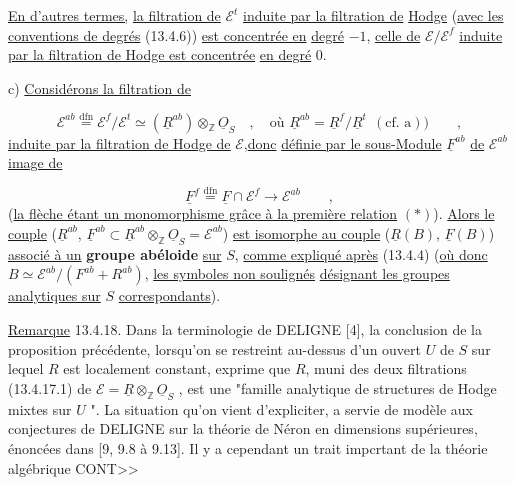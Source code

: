 
\underline{En d'autres termes,} \underline{la filtration de} $\mathcal{E}^t$ \underline{induite par la filtration de} \underline{Hodge} (\underline{avec les conventions de degrés} (13.4.6)) \underline{est concentrée en} \underline{degré} $-1$, \underline{celle de} $\mathcal{E}/\mathcal{E}^f$ \underline{induite par la filtration de Hodge est concentrée} \underline{en degré} $0$.

c) \underline{Considérons la filtration de}

\begin{equation*}
\mathcal{E}^{ab} \overset{\mathrm{dfn}}{=} \mathcal{E}^f/\mathcal{E}^t \simeq (\underline{R}^{ab}) \otimes_{\mathbb{Z}} \underline{O}_S \quad , \quad \text{où } \underline{R}^{ab} = \underline{R}^f/\underline{R}^t \ \ (\text{cf. a})) \qquad ,
\end{equation*}
\underline{induite par la filtration de Hodge de} $\mathcal{E}$,\underline{donc} \underline{définie par le sous-Module} $\underline{F}^{ab}$ \underline{de} $\mathcal{E}^{ab}$ \underline{image de}

\begin{equation*}
\underline{F}^f \overset{\mathrm{dfn}}{=} \underline{F} \cap \mathcal{E}^f \longrightarrow \mathcal{E}^{ab} \qquad ,
\end{equation*}
(\underline{la flèche étant un monomorphisme grâce à la première relation} $(*)$). \underline{Alors le couple} ($\underline{R}^{ab}$, $\underline{F}^{ab} \subset \underline{R}^{ab} \otimes_{\mathbb{Z}} \underline{O}_S = \mathcal{E}^{ab}$) \underline{est isomorphe au couple} ($\underline{R}(B)$, $\underline{F}(B)$) \underline{associé à un} \textbf{groupe abéloide} \underline{sur} $S$, \underline{comme expliqué après} (13.4.4) (\underline{où donc} $B \simeq \mathcal{E}^{ab}/(F^{ab}+ R^{ab})$, \underline{les symboles non soulignés} \underline{désignant les groupes analytiques sur} $S$ \underline{correspondants}).

\underline{Remarque} 13.4.18. Dans la terminologie de DELIGNE [4], la conclusion de la proposition précédente, lorsqu'on se restreint au-dessus d'un ouvert $U$ de $S$ sur lequel $R$ est localement constant, exprime que $R$, muni des deux filtrations (13.4.17.1) de $\mathcal{E} = \underline{R} \otimes_{\mathbb{Z}} \underline{O}_S$ , est une "famille analytique de structures de Hodge mixtes sur $U$ ". La situation qu'on vient d'expliciter, a servie de modèle aux conjectures de DELIGNE sur la théorie de Néron en dimensions supérieures, énoncées dans [9, 9.8 à 9.13]. Il y a cependant un trait impcrtant de la théorie algébrique CONT>>


